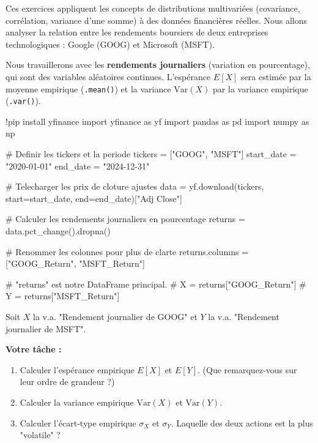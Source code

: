 Ces exercices appliquent les concepts de distributions multivariées (covariance, corrélation, variance d'une somme) à des données financières réelles. Nous allons analyser la relation entre les rendements boursiers de deux entreprises technologiques : Google (GOOG) et Microsoft (MSFT).

Nous travaillerons avec les \textbf{rendements journaliers} (variation en pourcentage), qui sont des variables aléatoires continues. L'espérance $E[X]$ sera estimée par la moyenne empirique (\texttt{.mean()}) et la variance $\text{Var}(X)$ par la variance empirique (\texttt{.var()}).

\begin{codecell}
!pip install yfinance
import yfinance as yf
import pandas as pd
import numpy as np

# Definir les tickers et la periode
tickers = ["GOOG", "MSFT"]
start_date = "2020-01-01"
end_date = "2024-12-31"

# Telecharger les prix de cloture ajustes
data = yf.download(tickers, start=start_date, end=end_date)["Adj Close"]

# Calculer les rendements journaliers en pourcentage
returns = data.pct_change().dropna()

# Renommer les colonnes pour plus de clarte
returns.columns = ["GOOG_Return", "MSFT_Return"]

# "returns" est notre DataFrame principal.
# X = returns["GOOG_Return"]
# Y = returns["MSFT_Return"]
\end{codecell}

\begin{exercicebox}
Soit $X$ la v.a. "Rendement journalier de GOOG" et $Y$ la v.a. "Rendement journalier de MSFT".

\textbf{Votre tâche :}
\begin{enumerate}
    \item Calculer l'espérance empirique $E[X]$ et $E[Y]$. (Que remarquez-vous sur leur ordre de grandeur ?)
    \item Calculer la variance empirique $\text{Var}(X)$ et $\text{Var}(Y)$.
    \item Calculer l'écart-type empirique $\sigma_X$ et $\sigma_Y$. Laquelle des deux actions est la plus "volatile" ?
\end{enumerate}
\end{exercicebox}

